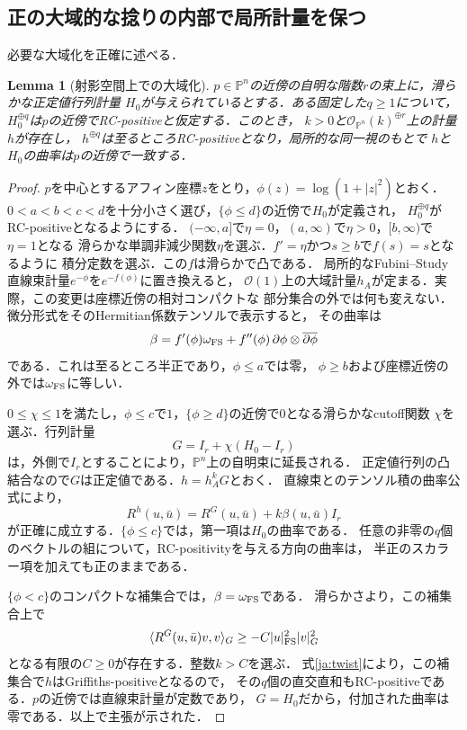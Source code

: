 \documentclass[12pt]{amsart}
\newtheorem{lem}[thm]{Lemma}
\theoremstyle{definition}
\theoremstyle{remark}
\numberwithin{equation}{section}
\theoremstyle{definition}
\begin{document}
\subsection{正の大域的な捻りの内部で局所計量を保つ}
必要な大域化を正確に述べる．

\begin{lem}[射影空間上での大域化]\label{ja:glue}
$p\in\mathbb P^n$の近傍の自明な階数$r$の束上に，滑らかな正定値行列計量
$H_0$が与えられているとする．ある固定した$q\geq1$について，
$H_0^{\oplus q}$は$p$の近傍でRC-positiveと仮定する．このとき，
$k>0$と$\mathcal O_{\mathbb P^n}(k)^{\oplus r}$上の計量$h$が存在し，
$h^{\oplus q}$は至るところRC-positiveとなり，局所的な同一視のもとで
$h$と$H_0$の曲率は$p$の近傍で一致する．
\end{lem}
\begin{proof}
$p$を中心とするアフィン座標$z$をとり，$\phi(z)=\log(1+|z|^2)$とおく．
$0<a<b<c<d$を十分小さく選び，$\{\phi\leq d\}$の近傍で$H_0$が定義され，
$H_0^{\oplus q}$がRC-positiveとなるようにする．
$(-\infty,a]$で$\eta=0$，$(a,\infty)$で$\eta>0$，$[b,\infty)$で$\eta=1$となる
滑らかな単調非減少関数$\eta$を選ぶ．$f'=\eta$かつ$s\geq b$で$f(s)=s$となるように
積分定数を選ぶ．この$f$は滑らかで凸である．
局所的なFubini--Study直線束計量$e^{-\phi}$を$e^{-f(\phi)}$に置き換えると，
$\mathcal O(1)$上の大域計量$h_A$が定まる．実際，この変更は座標近傍の相対コンパクトな
部分集合の外では何も変えない．微分形式をそのHermitian係数テンソルで表示すると，
その曲率は
\begin{equation}\label{ja:flatten}
 \beta=f'(\phi)\omega_{\rm FS}
       +f''(\phi)\,\partial\phi\otimes\overline{\partial\phi}
\end{equation}
である．これは至るところ半正であり，$\phi\leq a$では零，
$\phi\geq b$および座標近傍の外では$\omega_{\rm FS}$に等しい．

$0\leq\chi\leq1$を満たし，$\phi\leq c$で$1$，$\{\phi\geq d\}$の近傍で$0$となる滑らかなcutoff関数
$\chi$を選ぶ．行列計量
\[
 G=I_r+\chi(H_0-I_r)
\]
は，外側で$I_r$とすることにより，$\mathbb P^n$上の自明束に延長される．
正定値行列の凸結合なので$G$は正定値である．$h=h_A^kG$とおく．
直線束とのテンソル積の曲率公式により，
\begin{equation}\label{ja:twist}
 R^h(u,\bar u)=R^G(u,\bar u)+k\beta(u,\bar u)I_r
\end{equation}
が正確に成立する．$\{\phi\leq c\}$では，第一項は$H_0$の曲率である．
任意の非零の$q$個のベクトルの組について，RC-positivityを与える方向の曲率は，
半正のスカラー項を加えても正のままである．

$\{\phi<c\}$のコンパクトな補集合では，$\beta=\omega_{\rm FS}$である．
滑らかさより，この補集合上で
\[
 \langle R^G(u,\bar u)v,v\rangle_G
 \geq-C|u|_{\rm FS}^2|v|_G^2
\]
となる有限の$C\geq0$が存在する．整数$k>C$を選ぶ．
式\eqref{ja:twist}により，この補集合で$h$はGriffiths-positiveとなるので，
その$q$個の直交直和もRC-positiveである．$p$の近傍では直線束計量が定数であり，
$G=H_0$だから，付加された曲率は零である．以上で主張が示された．
\end{proof}
\end{document}

